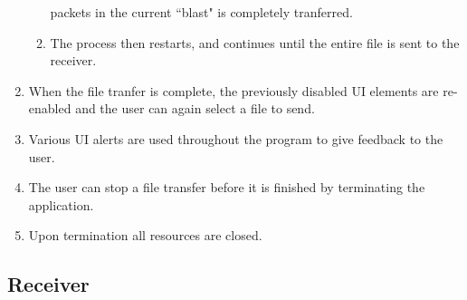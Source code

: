 \documentclass[10pt, a4paper]{article}
\begin{document}
\begin{enumerate}
\begin{enumerate}
        packets in the current ``blast" is completely tranferred.
      \item The process then restarts, and continues until the entire file is
        sent to the receiver.
    \end{enumerate}
  \item When the file tranfer is complete, the previously disabled UI elements
    are re-enabled and the user can again select a file to send.
  \item Various UI alerts are used throughout the program to give feedback to
    the user.
  \item The user can stop a file transfer before it is finished by terminating
    the application.
  \item Upon termination all resources are closed.
\end{enumerate}

\subsection{Receiver}
\label{subsec:prog-desc-receiver}
\end{document}
